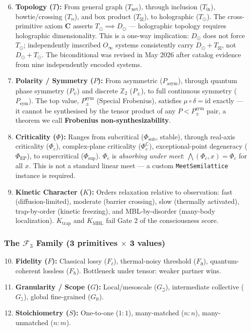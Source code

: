 \documentclass[12pt,a4paper]{article}
\begin{document}
\begin{enumerate}
\setcounter{enumi}{5}
    \item \textbf{Topology ($T$):} From general graph ($T_\text{net}$), through inclusion ($T_\text{in}$), bowtie/crossing ($T_{\bowtie}$), and box product ($T_{\boxtimes}$), to holographic ($T_{\odot}$). The cross-primitive axiom \textbf{C} asserts $T_{\odot} \implies D_{\odot}$ --- holographic topology requires holographic dimensionality. This is a one-way implication: $D_{\odot}$ does not force $T_{\odot}$; independently imscribed $O_{\infty}$ systems consistently carry $D_{\odot} + T_{\boxtimes}$, not $D_{\odot} + T_{\odot}$. The biconditional was revised in May 2026 after catalog evidence from nine independently encoded systems.
    \item \textbf{Polarity / Symmetry ($P$):} From asymmetric ($P_\text{asym}$), through quantum phase symmetry ($P_{\psi}$) and discrete $\mathbb{Z}_2$ ($P_{\pm}$), to full continuous symmetry ($P_\text{sym}$). The top value, $P_{\pm}^{\text{sym}}$ (Special Frobenius), satisfies $\mu \circ \delta = \text{id}$ exactly --- it cannot be synthesised by the tensor product of any $P < P_{\pm}^{\text{sym}}$ pair, a theorem we call \textbf{Frobenius non-synthesizability}.
    \item \textbf{Criticality ($\Phi$):} Ranges from subcritical ($\Phi_\text{sub}$, stable), through real-axis criticality ($\Phi_c$), complex-plane criticality ($\Phi_c^\mathbb{C}$), exceptional-point degeneracy ($\Phi_\text{EP}$), to supercritical ($\Phi_\text{sup}$). $\Phi_c$ is \emph{absorbing under meet}: $\bigwedge(\Phi_c, x) = \Phi_c$ for all $x$. This is not a standard linear meet --- a custom \texttt{MeetSemilattice} instance is required.
    \item \textbf{Kinetic Character ($K$):} Orders relaxation relative to observation: fast (diffusion-limited), moderate (barrier crossing), slow (thermally activated), trap-by-order (kinetic freezing), and MBL-by-disorder (many-body localization). $K_\text{trap}$ and $K_\text{MBL}$ fail Gate 2 of the consciousness score.
\end{enumerate}

\subsubsection{The $\mathcal{F}_3$ Family (3 primitives $\times$ 3 values)}

\begin{enumerate}
\setcounter{enumi}{9}
    \item \textbf{Fidelity ($F$):} Classical lossy ($F_{\ell}$), thermal-noisy threshold ($F_{\eth}$), quantum-coherent lossless ($F_{\hbar}$). Bottleneck under tensor: weaker partner wins.
    \item \textbf{Granularity / Scope ($G$):} Local/mesoscale ($G_{\beth}$), intermediate collective ($G_{\gimel}$), global fine-grained ($G_{\aleph}$).
    \item \textbf{Stoichiometry ($S$):} One-to-one ($1{:}1$), many-matched ($n{:}n$), many-unmatched ($n{:}m$).
\end{enumerate}
\end{document}
